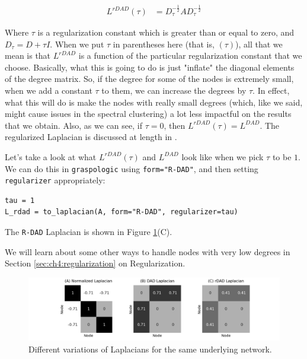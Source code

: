\begin{align*}
    L^{rDAD}(\tau) &= D_\tau^{-\frac{1}{2}}A D_\tau^{-\frac{1}{2}}
\end{align*}

Where $\tau$ is a regularization constant which is greater than or equal to zero, and $D_\tau = D + \tau I$. When we put $\tau$ in parentheses here (that is, $(\tau)$), all that we mean is that $L^{rDAD}$ is a function of the particular regularization constant that we choose. Basically, what this is going to do is just "inflate" the diagonal elements of the degree matrix. So, if the degree for some of the nodes is extremely small, when we add a constant $\tau$ to them, we can increase the degrees by $\tau$. In effect, what this will do is make the nodes with really small degrees (which, like we said, might cause issues in the spectral clustering) a lot less impactful on the results that we obtain. Also, as we can see, if $\tau = 0$, then $L^{rDAD}(\tau) = L^{DAD}$. The regularized Laplacian is discussed at length in \cite{Qin2013Sep}.

Let's take a look at what $L^{rDAD}(\tau)$ and $L^{DAD}$ look like when we pick $\tau$ to be $1$. We can do this in \texttt{graspologic} using \texttt{form="R-DAD"}, and then setting \texttt{regularizer} appropriately:
\begin{lstlisting}[style=python]
tau = 1
L_rdad = to_laplacian(A, form="R-DAD", regularizer=tau)
\end{lstlisting}
The \texttt{R-DAD} Laplacian is shown in Figure \ref{fig:ch4:normlapl}(C).

We will learn about some other ways to handle nodes with very low degrees in Section \ref{sec:ch4:regularization} on Regularization.

\begin{figure}[h]
    \centering
    \includegraphics[width=\linewidth]{representations/ch4/Images/normlapls.png}
    \caption[comparison of normalized Laplacians]{Different variations of Laplacians for the same underlying network.}
    \label{fig:ch4:normlapl}
\end{figure}

\newpage